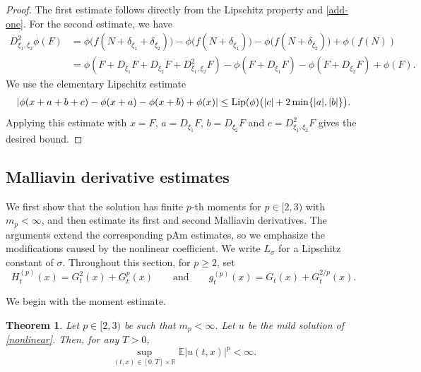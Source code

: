 \documentclass[12pt]{article}
\newtheorem{theorem}{Theorem}[section]
\def\bE{\mathbb{E}}
\def\bR{\mathbb{R}}
\begin{document}
\begin{proof}
The first estimate follows directly from the Lipschitz property and
\eqref{add-one}. For the second estimate, we have
\begin{align*}
D^2_{\xi_1,\xi_2}\phi(F)
&=
\phi\big(f(N+\delta_{\xi_1}+\delta_{\xi_2})\big)
-
\phi\big(f(N+\delta_{\xi_1})\big)
-
\phi\big(f(N+\delta_{\xi_2})\big)
+
\phi(f(N)) \\
&=
\phi\left(
F+D_{\xi_1}F+D_{\xi_2}F+D^2_{\xi_1,\xi_2}F
\right)
-
\phi\left(F+D_{\xi_1}F\right)
-
\phi\left(F+D_{\xi_2}F\right)
+
\phi(F).
\end{align*}
We use the elementary Lipschitz estimate
\[
|\phi(x+a+b+c)-\phi(x+a)-\phi(x+b)+\phi(x)|
\le
{\rm Lip}(\phi)
\big(
|c|+2\min\{|a|,|b|\}
\big).
\]
Applying this estimate with $x=F$,  $a=D_{\xi_1}F$, $b=D_{\xi_2}F$ and $c=D^2_{\xi_1,\xi_2}F$ gives the desired bound.

\end{proof}













\subsection{Malliavin derivative estimates}
 We first show that the solution has finite $p$-th moments for
$p\in[2,3)$ with $m_p<\infty$, and then estimate its first and second
Malliavin derivatives. The arguments extend the corresponding pAm estimates,
so we emphasize the modifications caused by the nonlinear coefficient. We write $L_\sigma$ for a Lipschitz constant of $\sigma$. 
Throughout this section, for $p\ge2$, set
\[
H_t^{(p)}(x)
=
G_t^2(x)+G_t^p(x) \qquad \text{and}\qquad g_t^{(p)}(x)
=
G_t(x)+G_t^{2/p}(x).
\]



We begin with the moment estimate.
\begin{theorem}
\label{thm-u-pth-moment-nonlinear}
Let $p\in [2,3)$ be such that $m_p<\infty$. Let $u$ be the mild solution of
\eqref{nonlinear}. Then, for any $T>0$,
\begin{equation}
\label{u-pth-moment}
    \sup_{(t,x)\in [0,T]\times \bR} \bE|u(t,x)|^p <\infty .
\end{equation}
\end{theorem}
\end{document}
